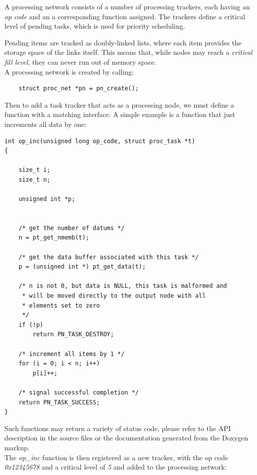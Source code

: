 \noindent
A processing network consists of a number of processing trackers, each having
an \emph{op code} and an a corresponding function assigned. The trackers define
a critical level of pending tasks, which is used for priority scheduling.

Pending items are tracked as doubly-linked lists, where each item provides the
storage space of the links itself. This means that, while nodes may reach a
\emph{critical fill level}, they can never run out of memory space.
\\

\noindent
A processing network is created by calling:

\begin{lstlisting}
	struct proc_net *pn = pn_create();
\end{lstlisting}

\noindent
Then to add a task tracker that acts as a processing node, we must define a
function with a matching interface. A simple example is a function
that just increments all data by one:

\begin{minipage}{\linewidth}
\begin{lstlisting}
int op_inc(unsigned long op_code, struct proc_task *t)
{

	size_t i;
	size_t n;

	unsigned int *p;


	/* get the number of datums */
	n = pt_get_nmemb(t);

	/* get the data buffer associated with this task */
	p = (unsigned int *) pt_get_data(t);

	/* n is not 0, but data is NULL, this task is malformed and
	 * will be moved directly to the output node with all
	 * elements set to zero
	 */
	if (!p)	
		return PN_TASK_DESTROY;

	/* increment all items by 1 */
	for (i = 0; i < n; i++)
		p[i]++;

	/* signal successful completion */
	return PN_TASK_SUCCESS;
}
\end{lstlisting}
\end{minipage}

\noindent
Such functions may return a variety of status code, please refer to the
API description in the source files or the documentation generated from the
\gls{Doxygen} markup.
\\

\noindent
The \emph{op\_inc} function is then registered as a new tracker, with the op
code \emph{0x12345678} and a critical level of \emph{5} and added to the
processing network:

